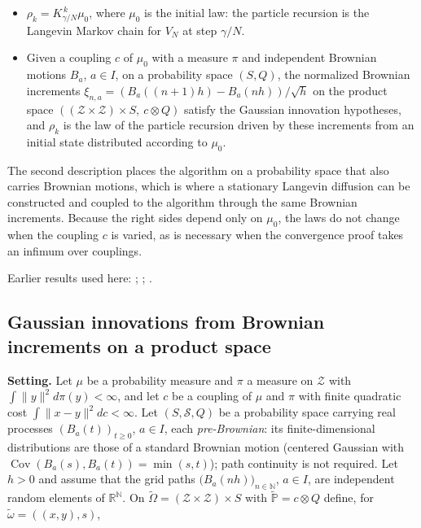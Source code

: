 \documentclass[11pt,a4paper]{report}
\begin{document}
\begin{itemize}


\item \(\rho_k=K_{\gamma/N}^{\,k}\mu_0\), where \(\mu_0\) is the initial law: the particle recursion is the Langevin Markov chain for \(V_N\) at step \(\gamma/N\).

\item Given a coupling \(c\) of \(\mu_0\) with a measure \(\pi\) and independent Brownian motions \(B_a\), \(a\in I\), on a probability space \((S,Q)\), the normalized Brownian increments \(\xi_{n,a}=(B_a((n+1)h)-B_a(nh))/\sqrt h\) on the product space \(((\mathcal Z\times\mathcal Z)\times S,\ c\otimes Q)\) satisfy the Gaussian innovation hypotheses, and \(\rho_k\) is the law of the particle recursion driven by these increments from an initial state distributed according to \(\mu_0\).

\end{itemize}



The second description places the algorithm on a probability space that also carries Brownian motions, which is where a stationary Langevin diffusion can be constructed and coupled to the algorithm through the same Brownian increments. Because the right sides depend only on \(\mu_0\), the laws do not change when the coupling \(c\) is varied, as is necessary when the convergence proof takes an infimum over couplings.



Earlier results used here: \cite[Section~3.32]{LangevinLean2026ULASC}; \cite[Section~3.42]{LangevinLean2026ULASC}; \cite[Section~3.41]{LangevinLean2026ULASC}.
\subsection{\texorpdfstring{Gaussian innovations from Brownian increments on a product space}{Gaussian innovations from Brownian increments on a product space}}
\label{report-step-IPLA-ULAAdapter-lean-1}


\textbf{Setting.} Let \(\mu\) be a probability measure and \(\pi\) a measure on \(\mathcal Z\) with \(\int\|y\|^2d\pi(y)<\infty\), and let \(c\) be a coupling of \(\mu\) and \(\pi\) with finite quadratic cost \(\int\|x-y\|^2dc<\infty\). Let \((S,\mathcal S,Q)\) be a probability space carrying real processes \((B_a(t))_{t\ge0}\), \(a\in I\), each \emph{pre-Brownian}: its finite-dimensional distributions are those of a standard Brownian motion (centered Gaussian with \(\operatorname{Cov}(B_a(s),B_a(t))=\min(s,t)\)); path continuity is not required. Let \(h>0\) and assume that the grid paths \(\bigl(B_a(nh)\bigr)_{n\in\mathbb N}\), \(a\in I\), are independent random elements of \(\mathbb R^{\mathbb N}\). On \(\tilde\Omega=(\mathcal Z\times\mathcal Z)\times S\) with \(\tilde{\mathbb P}=c\otimes Q\) define, for \(\tilde\omega=((x,y),s)\),
\end{document}
